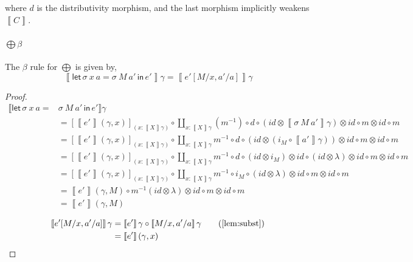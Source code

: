 \documentclass[acmsmall,nonacm]{acmart}
\newcommand{\sem}[1]{\left\llbracket{#1}\right\rrbracket}
\newcommand{\semg}[1]{\sem{#1}\gamma}
\newcommand{\letin}[3]{\mathsf{let}\, #1 = #2 \, \mathsf{in}\, #3}
\begin{document}
{where $d$ is the distributivity morphism, and the last morphism implicitly
weakens $\sem{C}$.

\paragraph{$\bigoplus\beta$}
The $\beta$ rule for $\bigoplus$ is given by,
\[
  \semg{\letin {\sigma~x~a} {\sigma~M~a'} {e'}} = \semg{e'[M/x,a'/a]}
\]
\begin{proof}
  \begin{align*}
  \llbracket \mathsf{let}\, {\sigma~x~a} = & {\sigma~M~a'} \, \mathsf{in}\, {e'} \rrbracket \gamma \\
  & = {[ \sem{e'}(\gamma , x) ]_{(x : \semg{X})}} \circ \coprod_{x:\semg{X}}(m^{-1}) \circ d \circ (id
  \otimes \semg{\sigma~M~a'}) \otimes id \circ m \otimes id \circ m \\
  & = {[ \sem{e'}(\gamma , x) ]_{(x : \semg{X})}} \circ \coprod_{x:\semg{X}}m^{-1} \circ d \circ (id
  \otimes (i_M \circ \semg{a'})) \otimes id \circ m \otimes id \circ m \\
  & = {[ \sem{e'}(\gamma , x) ]_{(x : \semg{X})}} \circ \coprod_{x:\semg{X}} m^{-1} \circ d \circ (id \otimes i_M) \otimes id \circ (id \otimes  \lambda) \otimes id \circ m \otimes id \circ m \\
  & = {[ \sem{e'}(\gamma , x) ]_{(x : \semg{X})}} \circ \coprod_{x:\semg{X}} m^{-1} \circ i_M \circ (id \otimes  \lambda) \otimes id \circ m \otimes id \circ m \\
  & = \sem{e'}(\gamma , M) \circ m^{-1} (id \otimes  \lambda) \otimes id \circ m \otimes id \circ m \\
  & = \sem{e'}(\gamma , M) \tag{coherence}
  \end{align*}

  \begin{align*}
    \semg{e'[M/x,a'/a]}
    &= \semg{e'} \circ \semg{M/x,a'/a} \tag{\cref{lem:subst}} \\
    &= \sem{e'}(\gamma , x)
  \end{align*}
\end{proof}

}
\end{document}
